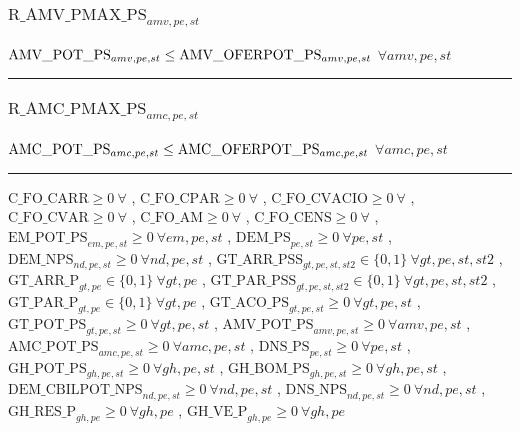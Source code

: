 \documentclass[11pt]{article}
\begin{document}
\subsubsection*{$\text{R\_AMV\_PMAX\_PS}_{amv, pe, st}$} \label{R_AMV_PMAX_PS}
$
\textcolor{black}{\text{AMV\_POT\_PS}}_{amv, pe, st} \leq \textcolor{black}{\text{AMV\_OFERPOT\_PS}}_{amv, pe, st}
$
\hfill
$
\forall{ amv, pe, st} 
$ \\
\hrule 
\subsubsection*{$\text{R\_AMC\_PMAX\_PS}_{amc, pe, st}$} \label{R_AMC_PMAX_PS}
$
\textcolor{black}{\text{AMC\_POT\_PS}}_{amc, pe, st} \leq \textcolor{black}{\text{AMC\_OFERPOT\_PS}}_{amc, pe, st}
$
\hfill
$
\forall{ amc, pe, st} 
$ \\
\hrule 
\bigskip
$\text{C\_FO\_CARR}\geq 0 ~ \forall $ , $\text{C\_FO\_CPAR}\geq 0 ~ \forall $ , $\text{C\_FO\_CVACIO}\geq 0 ~ \forall $ , $\text{C\_FO\_CVAR}\geq 0 ~ \forall $ , $\text{C\_FO\_AM}\geq 0 ~ \forall $ , $\text{C\_FO\_CENS}\geq 0 ~ \forall $ , $\text{EM\_POT\_PS}_{em, pe, st}\geq 0 ~ \forall em, pe, st$ , $\text{DEM\_PS}_{pe, st}\geq 0 ~ \forall pe, st$ , $\text{DEM\_NPS}_{nd, pe, st}\geq 0 ~ \forall nd, pe, st$ , $\text{GT\_ARR\_PSS}_{gt, pe, st, st2}\in \{0,1\} ~ \forall gt, pe, st, st2$ , $\text{GT\_ARR\_P}_{gt, pe}\in \{0,1\} ~ \forall gt, pe$ , $\text{GT\_PAR\_PSS}_{gt, pe, st, st2}\in \{0,1\} ~ \forall gt, pe, st, st2$ , $\text{GT\_PAR\_P}_{gt, pe}\in \{0,1\} ~ \forall gt, pe$ , $\text{GT\_ACO\_PS}_{gt, pe, st}\geq 0 ~ \forall gt, pe, st$ , $\text{GT\_POT\_PS}_{gt, pe, st}\geq 0 ~ \forall gt, pe, st$ , $\text{AMV\_POT\_PS}_{amv, pe, st}\geq 0 ~ \forall amv, pe, st$ , $\text{AMC\_POT\_PS}_{amc, pe, st}\geq 0 ~ \forall amc, pe, st$ , $\text{DNS\_PS}_{pe, st}\geq 0 ~ \forall pe, st$ , $\text{GH\_POT\_PS}_{gh, pe, st}\geq 0 ~ \forall gh, pe, st$ , $\text{GH\_BOM\_PS}_{gh, pe, st}\geq 0 ~ \forall gh, pe, st$ , $\text{DEM\_CBILPOT\_NPS}_{nd, pe, st}\geq 0 ~ \forall nd, pe, st$ , $\text{DNS\_NPS}_{nd, pe, st}\geq 0 ~ \forall nd, pe, st$ , $\text{GH\_RES\_P}_{gh, pe}\geq 0 ~ \forall gh, pe$ , $\text{GH\_VE\_P}_{gh, pe}\geq 0 ~ \forall gh, pe$ 
\bigskip
\end{document}

